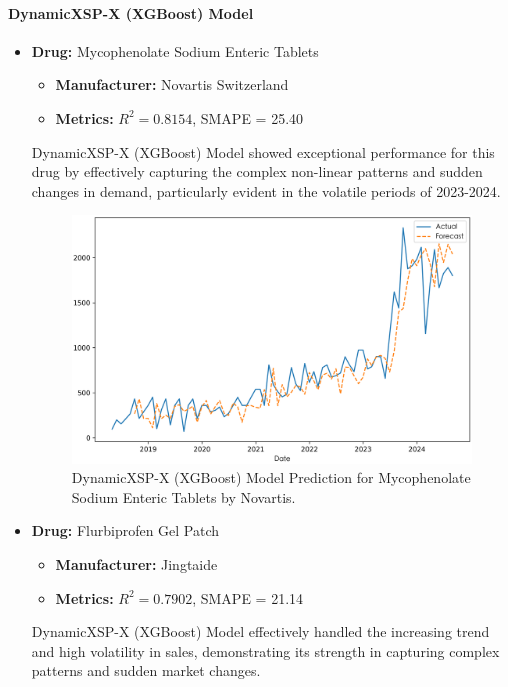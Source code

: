 \documentclass[journal]{IEEEtran}
\begin{document}
\paragraph{DynamicXSP-X (XGBoost) Model} 
\begin{itemize}
\item \textbf{Drug:} Mycophenolate Sodium Enteric Tablets
\begin{itemize}
\item \textbf{Manufacturer:} Novartis Switzerland
\item \textbf{Metrics:} $R^2 = 0.8154$, SMAPE = 25.40
\end{itemize}
DynamicXSP-X (XGBoost) Model showed exceptional performance for this drug by effectively capturing the complex non-linear patterns and sudden changes in demand, particularly evident in the volatile periods of 2023-2024.
\begin{figure}[H]
\centering
\includegraphics[width=\linewidth]{../Result_Paper/XGBoost_Prediction_麦考酚钠肠溶片_瑞士诺华.png}
\caption{DynamicXSP-X (XGBoost) Model Prediction for Mycophenolate Sodium Enteric Tablets by Novartis.}
\label{fig:mycophenolate}
\end{figure}
\item \textbf{Drug:} Flurbiprofen Gel Patch
\begin{itemize}
\item \textbf{Manufacturer:} Jingtaide
\item \textbf{Metrics:} $R^2 = 0.7902$, SMAPE = 21.14
\end{itemize}
DynamicXSP-X (XGBoost) Model effectively handled the increasing trend and high volatility in sales, demonstrating its strength in capturing complex patterns and sudden market changes.
\begin{figure}[H]

\end{figure}
\end{itemize}
\end{document}
